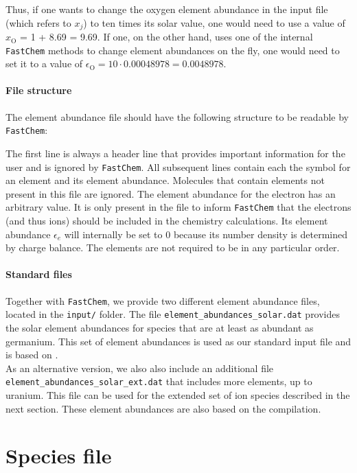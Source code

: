 \documentclass[numbers=noenddot]{fcmanual}
\newcommand{\fc}{\texttt{FastChem}\xspace}
\begin{document}
Thus, if one wants to change the oxygen element abundance in the input file (which refers to $x_j$) to ten times its solar value, one would need to use a value of $x_\mathrm{O}$ = 1 + 8.69 = 9.69. If one, on the other hand, uses one of the internal \fc methods to change element abundances on the fly, one would need to set it to a value of $\epsilon_\mathrm{O} = 10 \cdot 0.00048978 =  0.0048978$.

\newpage
\paragraph{File structure}
The element abundance file should have the following structure to be readable by \fc:


The first line is always a header line that provides important information for the user and is ignored by \fc. All subsequent lines contain each the symbol for an element and its element abundance. Molecules that contain elements not present in this file are ignored. The element abundance for  the electron has an arbitrary value. It is only present in the file to inform \fc that the electrons (and thus ions) should be included in the chemistry calculations. Its element abundance $\epsilon_e$ will internally be set to 0 because its number density is determined by charge balance. The elements are not required to be in any particular order. 


\paragraph{Standard files}
Together with \fc, we provide two different element abundance files, located in the \verb|input/| folder. The file \verb|element_abundances_solar.dat| provides the solar element abundances for species that are at least as abundant as germanium. This set of element abundances is used as our standard input file and is based on \citet{Asplund2009ARA&A..47..481A}.\\
As an alternative version, we also also include an additional file \verb|element_abundances_solar_ext.dat| that includes more elements, up to uranium. This file can be used for the extended set of ion species described in the next section. These element abundances are also based on the \citet{Asplund2009ARA&A..47..481A} compilation.


\section{Species file}
\end{document}

